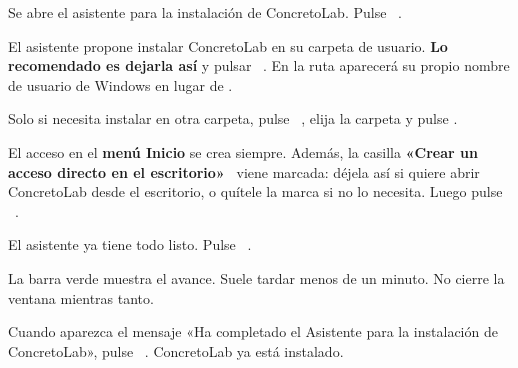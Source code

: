 
Se abre el asistente para la instalación de ConcretoLab. Pulse ~.



El asistente propone instalar ConcretoLab en su carpeta de usuario. \textbf{Lo recomendado es dejarla así} y pulsar
~. En la ruta aparecerá su propio nombre de usuario de Windows en lugar de
.

Solo si necesita instalar en otra carpeta, pulse ~, elija la carpeta y pulse
.



El acceso en el \textbf{menú Inicio} se crea siempre. Además, la casilla \textbf{«Crear un acceso directo en el
escritorio»}~ viene marcada: déjela así si quiere abrir ConcretoLab desde el escritorio, o quítele la marca si
no lo necesita. Luego pulse ~.



El asistente ya tiene todo listo. Pulse ~.



La barra verde muestra el avance. Suele tardar menos de un minuto. No cierre la ventana mientras tanto.



Cuando aparezca el mensaje «Ha completado el Asistente para la instalación de ConcretoLab», pulse
~. ConcretoLab ya está instalado.

